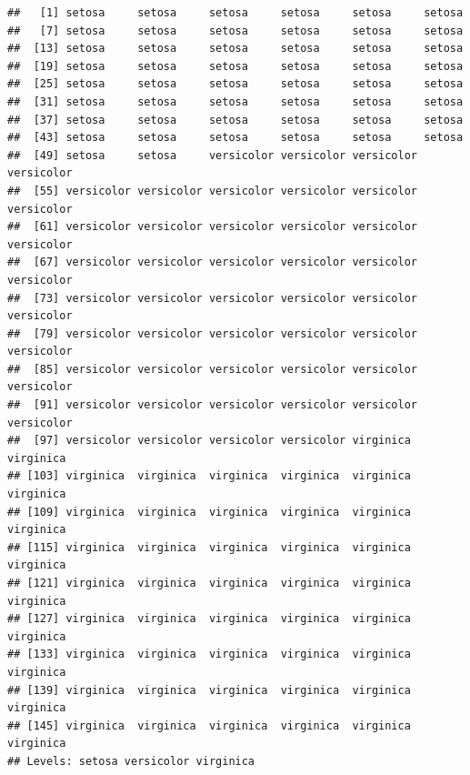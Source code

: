 \documentclass[]{book}
\newenvironment{Shaded}{\begin{snugshade}}{\end{snugshade}}
\newcommand{\DecValTok}[1]{\textcolor[rgb]{0.00,0.00,0.81}{#1}}
\newcommand{\StringTok}[1]{\textcolor[rgb]{0.31,0.60,0.02}{#1}}
\newcommand{\OperatorTok}[1]{\textcolor[rgb]{0.81,0.36,0.00}{\textbf{#1}}}
\newcommand{\NormalTok}[1]{#1}
\theoremstyle{definition}
\theoremstyle{definition}
\theoremstyle{definition}
\theoremstyle{remark}
\begin{document}
\begin{verbatim}
##   [1] setosa     setosa     setosa     setosa     setosa     setosa    
##   [7] setosa     setosa     setosa     setosa     setosa     setosa    
##  [13] setosa     setosa     setosa     setosa     setosa     setosa    
##  [19] setosa     setosa     setosa     setosa     setosa     setosa    
##  [25] setosa     setosa     setosa     setosa     setosa     setosa    
##  [31] setosa     setosa     setosa     setosa     setosa     setosa    
##  [37] setosa     setosa     setosa     setosa     setosa     setosa    
##  [43] setosa     setosa     setosa     setosa     setosa     setosa    
##  [49] setosa     setosa     versicolor versicolor versicolor versicolor
##  [55] versicolor versicolor versicolor versicolor versicolor versicolor
##  [61] versicolor versicolor versicolor versicolor versicolor versicolor
##  [67] versicolor versicolor versicolor versicolor versicolor versicolor
##  [73] versicolor versicolor versicolor versicolor versicolor versicolor
##  [79] versicolor versicolor versicolor versicolor versicolor versicolor
##  [85] versicolor versicolor versicolor versicolor versicolor versicolor
##  [91] versicolor versicolor versicolor versicolor versicolor versicolor
##  [97] versicolor versicolor versicolor versicolor virginica  virginica 
## [103] virginica  virginica  virginica  virginica  virginica  virginica 
## [109] virginica  virginica  virginica  virginica  virginica  virginica 
## [115] virginica  virginica  virginica  virginica  virginica  virginica 
## [121] virginica  virginica  virginica  virginica  virginica  virginica 
## [127] virginica  virginica  virginica  virginica  virginica  virginica 
## [133] virginica  virginica  virginica  virginica  virginica  virginica 
## [139] virginica  virginica  virginica  virginica  virginica  virginica 
## [145] virginica  virginica  virginica  virginica  virginica  virginica 
## Levels: setosa versicolor virginica
\end{verbatim}

\begin{Shaded}
\end{Shaded}
\end{document}
